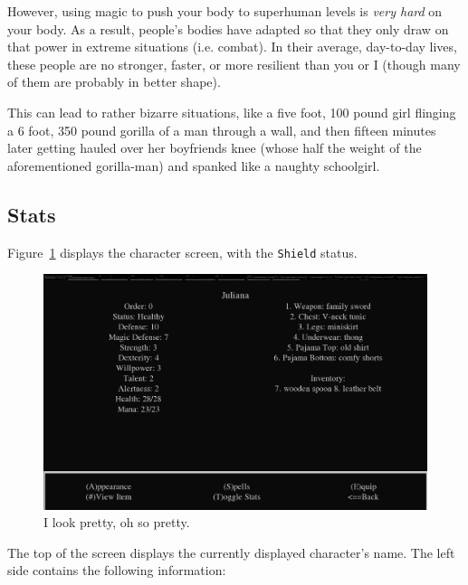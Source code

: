 \documentclass{report}
\begin{document}
\begin{itemize}
However, using magic to push your body to superhuman levels is \emph{very hard} on your body. As a result, people's bodies have adapted so that they only draw on that power in extreme situations 
(i.e. combat). In their average, day-to-day lives, these people are no stronger, faster, or more resilient than you or I (though many of them are probably in better shape). 

This can lead to rather bizarre situations, like a five foot, 100 pound girl flinging a 6 foot, 350 pound gorilla of a man through a wall, and then fifteen minutes later getting hauled over her 
boyfriends knee (whose half the weight of the aforementioned gorilla-man) and spanked like a naughty schoolgirl.

\subsection{Stats}
Figure~\ref{fig_char_screen} displays the character screen, with the 
\verb|Shield| status.

\begin{figure}[h!]
    \includegraphics[width=\textwidth]{character_sheet}
    \caption{I look pretty, oh so pretty.}
    \label{fig_char_screen}
\end{figure}

The top of the screen displays the currently displayed character's name. The left 
side contains the following information:


\end{itemize}
\end{document}
